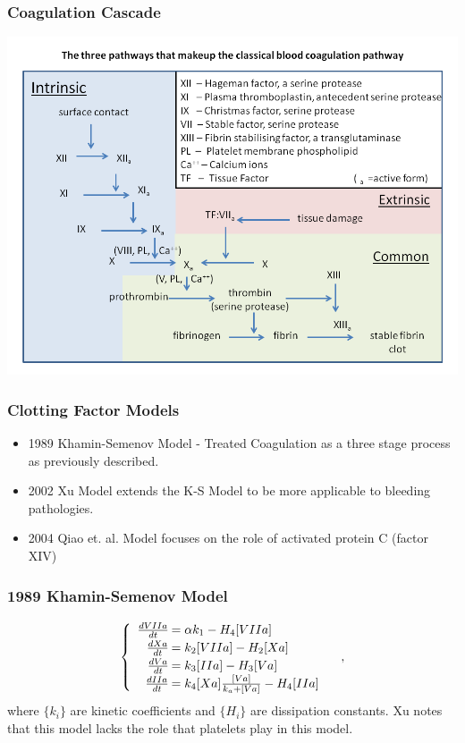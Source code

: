\begin{frame}\frametitle{Coagulation Cascade}
\includegraphics[natwidth=162bp,natheight=227bp,width=280bp]{./coag-cascade.png}
\end{frame}

\begin{frame}\frametitle{Clotting Factor Models}
\begin{itemize}
\item 1989 Khamin-Semenov Model - Treated Coagulation as a three stage process as previously described.\\
\item 2002 Xu Model extends the K-S Model to be more applicable to bleeding pathologies.\\
\item 2004 Qiao et. al. Model focuses on the role of activated protein C (factor XIV)
\end{itemize}
\end{frame}

\begin{frame}
\frametitle{1989 Khamin-Semenov Model}
$$\begin{cases}\begin{array}{rl}
\frac{dVIIa}{dt}\hspace{-.8em}&=\alpha k_1- H_4[VIIa]\\
\frac{dXa}{dt}\hspace{-.8em}&=k_2[VIIa]-H_2[Xa]\\
\frac{dVa}{dt}\hspace{-.8em}&=k_3[IIa]-H_3[Va]\\
\frac{dIIa}{dt}\hspace{-.8em}&=k_4[Xa]\frac{[Va]}{k_a+[Va]}-H_4[IIa]
\end{array}\end{cases},$$ where $\{k_i\}$ are kinetic coefficients and $\{H_i\}$ are dissipation constants. Xu notes that this model lacks the role that platelets play in this model.
\end{frame}

